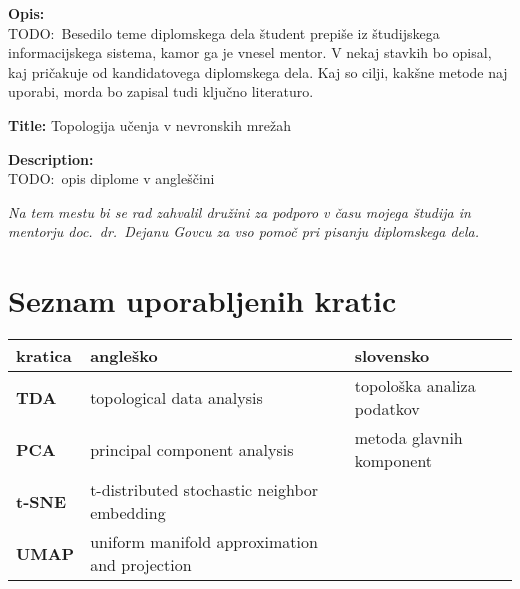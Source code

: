 \bigskip
\noindent\textbf{Opis:}\\
TODO:\ Besedilo teme diplomskega dela študent prepiše iz študijskega informacijskega sistema, kamor ga je vnesel mentor.
V nekaj stavkih bo opisal, kaj pričakuje od kandidatovega diplomskega dela.
Kaj so cilji, kakšne metode naj uporabi, morda bo zapisal tudi ključno literaturo.

\bigskip
\noindent\textbf{Title:} Topologija učenja v nevronskih mrežah

\bigskip
\noindent\textbf{Description:}\\
TODO:\ opis diplome v angleščini

\vfill



\vspace{2cm}

\clearemptydoublepage{}

\thispagestyle{empty}\mbox{}\vfill\null\it%
\noindent
Na tem mestu bi se rad zahvalil družini za podporo v času mojega študija in mentorju doc.\ dr.\ Dejanu Govcu za vso pomoč pri pisanju diplomskega dela.
\rm\normalfont{}

\clearemptydoublepage{}

\clearemptydoublepage{}


\pagestyle{empty}
\def\thepage{}%
\tableofcontents{}


\clearemptydoublepage{}

\chapter*{Seznam uporabljenih kratic}

\noindent\begin{tabular}{p{}|p{}|p{}}    %
  {\bf kratica} & {\bf angleško}               & {\bf slovensko}            \\ \hline
  {\bf TDA}     & topological data analysis    & topološka analiza podatkov \\
  {\bf PCA}     & principal component analysis & metoda glavnih komponent   \\
  {\bf t-SNE}     & t-distributed stochastic neighbor embedding &    \\
  {\bf UMAP}     & uniform manifold approximation and projection &    \\

\end{tabular}


